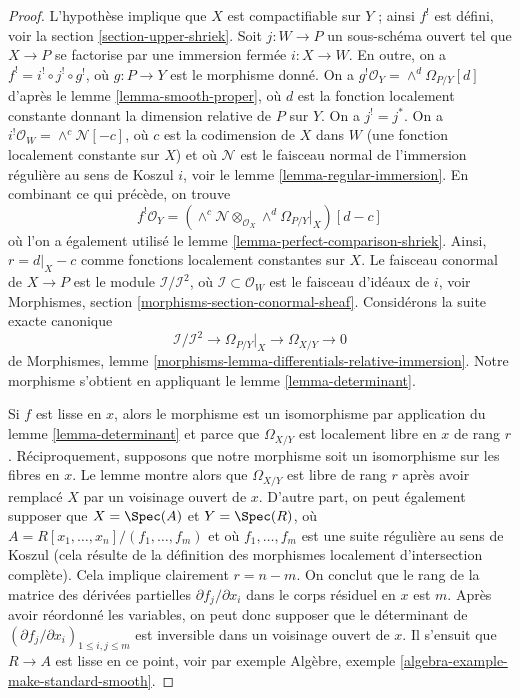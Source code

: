\begin{proof}
L'hypothèse implique que $X$ est compactifiable sur $Y$ ; ainsi $f^!$ est défini, voir la section \ref{section-upper-shriek}. Soit $j : W \to P$ un sous-schéma ouvert tel que $X \to P$ se factorise par une immersion fermée $i : X \to W$. En outre, on a $f^! = i^! \circ j^! \circ g^!$, où $g : P \to Y$ est le morphisme donné. On a $g^!\mathcal{O}_Y = \wedge^d\Omega_{P/Y}[d]$ d'après le lemme \ref{lemma-smooth-proper}, où $d$ est la fonction localement constante donnant la dimension relative de $P$ sur $Y$. On a $j^! = j^*$. On a $i^!\mathcal{O}_W = \wedge^c\mathcal{N}[-c]$, où $c$ est la codimension de $X$ dans $W$ (une fonction localement constante sur $X$) et où $\mathcal{N}$ est le faisceau normal de l'immersion régulière au sens de Koszul $i$, voir le lemme \ref{lemma-regular-immersion}. En combinant ce qui précède, on trouve
$$
f^!\mathcal{O}_Y =
\left(\wedge^c\mathcal{N} \otimes_{\mathcal{O}_X}
\wedge^d\Omega_{P/Y}|_X\right)[d - c]
$$
où l'on a également utilisé le lemme \ref{lemma-perfect-comparison-shriek}. Ainsi, $r = d|_X - c$ comme fonctions localement constantes sur $X$. Le faisceau conormal de $X \to P$ est le module $\mathcal{I}/\mathcal{I}^2$, où $\mathcal{I} \subset \mathcal{O}_W$ est le faisceau d'idéaux de $i$, voir Morphismes, section \ref{morphisms-section-conormal-sheaf}. Considérons la suite exacte canonique
$$
\mathcal{I}/\mathcal{I}^2 \to
\Omega_{P/Y}|_X \to \Omega_{X/Y} \to 0
$$
de Morphismes, lemme \ref{morphisms-lemma-differentials-relative-immersion}. Notre morphisme s'obtient en appliquant le lemme \ref{lemma-determinant}.

\medskip\noindent
Si $f$ est lisse en $x$, alors le morphisme est un isomorphisme par application du lemme \ref{lemma-determinant} et parce que $\Omega_{X/Y}$ est localement libre en $x$ de rang $r$. Réciproquement, supposons que notre morphisme soit un isomorphisme sur les fibres en $x$. Le lemme montre alors que $\Omega_{X/Y}$ est libre de rang $r$ après avoir remplacé $X$ par un voisinage ouvert de $x$. D'autre part, on peut également supposer que $X = \Spec(A)$ et $Y = \Spec(R)$, où $A = R[x_1, \ldots, x_n]/(f_1, \ldots, f_m)$ et où $f_1, \ldots, f_m$ est une suite régulière au sens de Koszul (cela résulte de la définition des morphismes localement d'intersection complète). Cela implique clairement $r = n - m$. On conclut que le rang de la matrice des dérivées partielles $\partial f_j/\partial x_i$ dans le corps résiduel en $x$ est $m$. Après avoir réordonné les variables, on peut donc supposer que le déterminant de $(\partial f_j/\partial x_i)_{1 \leq i, j \leq m}$ est inversible dans un voisinage ouvert de $x$. Il s'ensuit que $R \to A$ est lisse en ce point, voir par exemple Algèbre, exemple \ref{algebra-example-make-standard-smooth}.
\end{proof}


